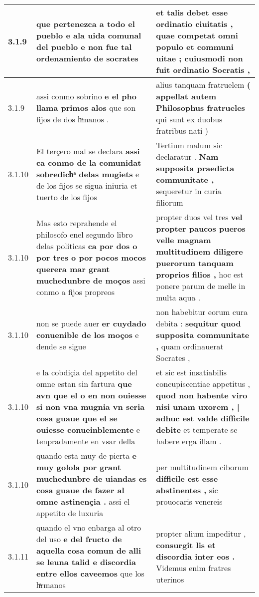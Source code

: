 \begin{tabular}{|p{1cm}|p{6.5cm}|p{6.5cm}|}
3.1.9 & que pertenezca a todo el pueblo \textbf{ e ala uida comunal del pueblo } e non fue tal ordenamiento de socrates & et talis debet esse ordinatio ciuitatis , \textbf{ quae competat omni populo et communi uitae ; } cuiusmodi non fuit ordinatio Socratis , \\\hline
3.1.9 & assi conmo sobrino \textbf{ e el pho llama primos alos } que son fijos de dos hͣmanos . & alius tanquam fratruelem \textbf{ ( appellat autem Philosophus fratrueles } qui sunt ex duobus fratribus nati ) \\\hline
3.1.10 & El terçero mal se declara \textbf{ assi ca conmo de la comunidat sobredichͣ delas mugiets } e de los fijos se sigua iniuria et tuerto de los fijos & Tertium malum sic declaratur . \textbf{ Nam supposita praedicta communitate , } sequeretur in curia filiorum \\\hline
3.1.10 & Mas esto reprahende el philosofo enel segundo libro delas politicas \textbf{ ca por dos o por tres o por pocos mocos querera mar grant muchedunbre de moços } assi conmo a fijos propreos & propter duos vel tres \textbf{ vel propter paucos pueros velle magnam multitudinem diligere puerorum tanquam proprios filios , } hoc est ponere parum de melle in multa aqua . \\\hline
3.1.10 & non se puede auer \textbf{ er cuydado conuenible de los moços } e dende se sigue & non habebitur eorum cura debita : \textbf{ sequitur quod supposita communitate , } quam ordinauerat Socrates , \\\hline
3.1.10 & e la cobdiçia del appetito del omne estan sin fartura \textbf{ que avn que el o en non ouiesse si non vna mugnia vn seria cosa guaue que el se ouiesse conueinblemente } e tenpradamente en vsar della & et sic est insatiabilis concupiscentiae appetitus , \textbf{ quod non habente viro nisi unam uxorem , | adhuc est valde difficile debite } et temperate se habere erga illam . \\\hline
3.1.10 & quando esta muy de pierta \textbf{ e muy golola por grant muchedunbre de uiandas es cosa guaue de fazer al omne astinençia . } assi el appetito de luxuria & per multitudinem ciborum \textbf{ difficile est esse abstinentes , } sic prouocaris venereis \\\hline
3.1.11 & quando el vno enbarga al otro del uso \textbf{ e del fructo de aquella cosa comun de alli se leuna talid e discordia entre ellos caveemos } que los hͣrmanos & propter alium impeditur , \textbf{ consurgit lis et discordia inter eos . } Videmus enim fratres uterinos \\\hline

\end{tabular}

